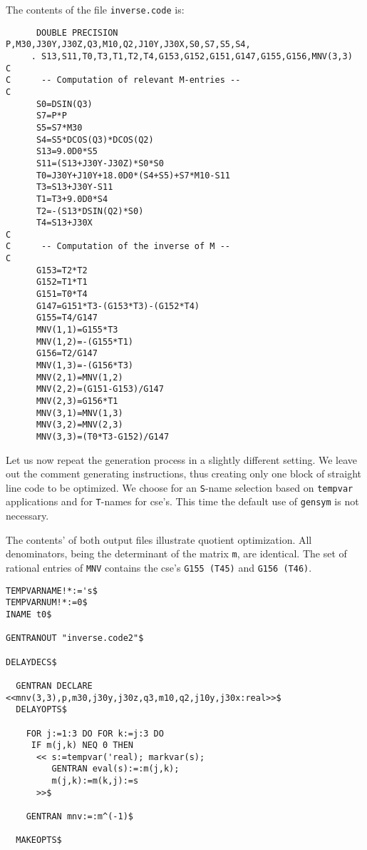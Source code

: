{The contents of the file {\tt inverse.code} is:
{\small
\begin{verbatim}
      DOUBLE PRECISION P,M30,J30Y,J30Z,Q3,M10,Q2,J10Y,J30X,S0,S7,S5,S4,
     . S13,S11,T0,T3,T1,T2,T4,G153,G152,G151,G147,G155,G156,MNV(3,3)
C
C      -- Computation of relevant M-entries --
C
      S0=DSIN(Q3)
      S7=P*P
      S5=S7*M30
      S4=S5*DCOS(Q3)*DCOS(Q2)
      S13=9.0D0*S5
      S11=(S13+J30Y-J30Z)*S0*S0
      T0=J30Y+J10Y+18.0D0*(S4+S5)+S7*M10-S11
      T3=S13+J30Y-S11
      T1=T3+9.0D0*S4
      T2=-(S13*DSIN(Q2)*S0)
      T4=S13+J30X
C
C      -- Computation of the inverse of M --
C
      G153=T2*T2
      G152=T1*T1
      G151=T0*T4
      G147=G151*T3-(G153*T3)-(G152*T4)
      G155=T4/G147
      MNV(1,1)=G155*T3
      MNV(1,2)=-(G155*T1)
      G156=T2/G147
      MNV(1,3)=-(G156*T3)
      MNV(2,1)=MNV(1,2)
      MNV(2,2)=(G151-G153)/G147
      MNV(2,3)=G156*T1
      MNV(3,1)=MNV(1,3)
      MNV(3,2)=MNV(2,3)
      MNV(3,3)=(T0*T3-G152)/G147
\end{verbatim}}

Let us now repeat the generation process in a slightly different setting.
We leave out the comment generating instructions, thus creating only one
block of straight line code to be optimized. We choose for an {\tt S}-name
selection based on {\tt tempvar} applications and for {\tt T}-names for cse's.
This time the default use of {\tt gensym} is not necessary.

The contents' of both output files illustrate quotient optimization.
All denominators, being the determinant of the matrix {\tt m}, are identical.
The set of rational entries of {\tt MNV} contains the cse's {\tt G155 (T45)}
and {\tt G156 (T46)}.
{\small
\begin{verbatim}
TEMPVARNAME!*:='s$
TEMPVARNUM!*:=0$
INAME t0$

GENTRANOUT "inverse.code2"$

DELAYDECS$

  GENTRAN DECLARE <<mnv(3,3),p,m30,j30y,j30z,q3,m10,q2,j10y,j30x:real>>$
  DELAYOPTS$

    FOR j:=1:3 DO FOR k:=j:3 DO
     IF m(j,k) NEQ 0 THEN
      << s:=tempvar('real); markvar(s);
         GENTRAN eval(s):=:m(j,k);
         m(j,k):=m(k,j):=s
      >>$

    GENTRAN mnv:=:m^(-1)$

  MAKEOPTS$


\end{verbatim}}}
